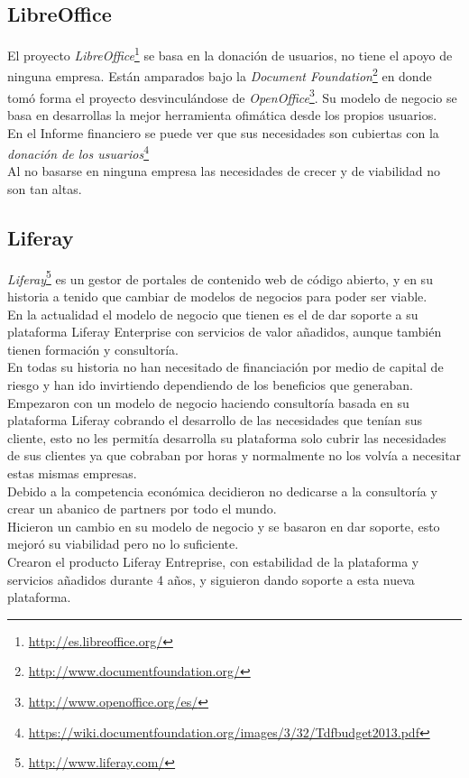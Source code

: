 \documentclass[12pt]{article} %
\begin{document}
\subsection{LibreOffice} %

El proyecto \emph{LibreOffice}\footnote{\url{http://es.libreoffice.org/}} se basa en la donación de usuarios, no tiene el apoyo de ninguna empresa. Están amparados bajo la \emph{Document Foundation}\footnote{\url{http://www.documentfoundation.org/}} en donde tomó forma el proyecto desvinculándose de \emph{OpenOffice}\footnote{\url{http://www.openoffice.org/es/}}. Su modelo de negocio se basa en desarrollas la mejor herramienta ofimática desde los propios usuarios. \\En el Informe financiero se puede ver que sus necesidades son cubiertas con la \emph{donación de los usuarios}\footnote{\url{https://wiki.documentfoundation.org/images/3/32/Tdfbudget2013.pdf}}\\Al no basarse en ninguna empresa las necesidades de crecer y de viabilidad no son tan altas. 


\subsection{Liferay} %

\emph{Liferay}\footnote{\url{http://www.liferay.com/}} es un gestor de portales de contenido web de código abierto, y en su historia a tenido que cambiar de modelos de negocios para poder ser viable.\\En la actualidad el modelo de negocio que tienen es el de dar soporte a su plataforma Liferay Enterprise con servicios de valor añadidos, aunque también tienen formación y consultoría.\\En todas su historia no han necesitado de financiación por medio de capital de riesgo y han ido invirtiendo dependiendo de los beneficios que generaban.\\Empezaron con un modelo de negocio haciendo consultoría basada en su plataforma Liferay cobrando el desarrollo de las necesidades que tenían sus cliente, esto no les permitía desarrolla su plataforma solo cubrir las necesidades de sus clientes ya que cobraban por horas y normalmente no los volvía a necesitar estas mismas empresas.\\ Debido a la competencia económica decidieron no dedicarse a la consultoría y crear un abanico de partners por todo el mundo.\\Hicieron un cambio en su modelo de negocio y se basaron en dar soporte, esto mejoró su viabilidad pero no lo suficiente.
\\Crearon el producto Liferay Entreprise, con estabilidad de la plataforma y servicios añadidos durante 4 años, y siguieron dando soporte a esta nueva plataforma.
\end{document}
